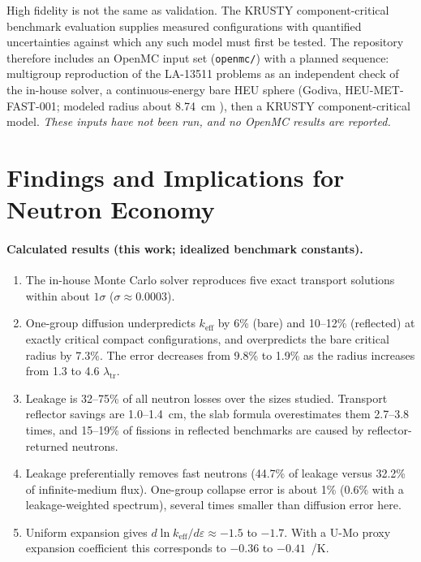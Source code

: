 \documentclass[11pt,letterpaper]{article}
\newcommand{\keff}{k_\mathrm{eff}}
\newcommand{\ltr}{\lambda_\mathrm{tr}}
\begin{document}
High fidelity is not the same as validation. The KRUSTY component-critical benchmark evaluation \citep{Stolte2022} supplies measured configurations with quantified uncertainties against which any such model must first be tested. The repository therefore includes an OpenMC input set (\texttt{openmc/}) with a planned sequence: multigroup reproduction of the LA-13511 problems as an independent check of the in-house solver, a continuous-energy bare HEU sphere (Godiva, HEU-MET-FAST-001; modeled radius about \SI{8.74}{cm} \citep{Trkov2020}), then a KRUSTY component-critical model. \emph{These inputs have not been run, and no OpenMC results are reported.}

\section{Findings and Implications for Neutron Economy}
\label{sec:findings}

\paragraph{Calculated results (this work; idealized benchmark constants).}
\begin{enumerate}[label=C\arabic*.]
  \item The in-house Monte Carlo solver reproduces five exact transport solutions within about $1\sigma$ ($\sigma \approx 0.0003$).
  \item One-group diffusion underpredicts $\keff$ by 6\% (bare) and 10--12\% (reflected) at exactly critical compact configurations, and overpredicts the bare critical radius by 7.3\%. The error decreases from 9.8\% to 1.9\% as the radius increases from 1.3 to 4.6 $\ltr$.
  \item Leakage is 32--75\% of all neutron losses over the sizes studied. Transport reflector savings are 1.0--1.4~cm, the slab formula overestimates them 2.7--3.8 times, and 15--19\% of fissions in reflected benchmarks are caused by reflector-returned neutrons.
  \item Leakage preferentially removes fast neutrons (44.7\% of leakage versus 32.2\% of infinite-medium flux). One-group collapse error is about 1\% (0.6\% with a leakage-weighted spectrum), several times smaller than diffusion error here.
  \item Uniform expansion gives $d\ln\keff/d\varepsilon \approx -1.5$ to $-1.7$. With a U-Mo proxy expansion coefficient this corresponds to $-0.36$ to $-0.41$~\textcent/K.
\end{enumerate}
\end{document}

